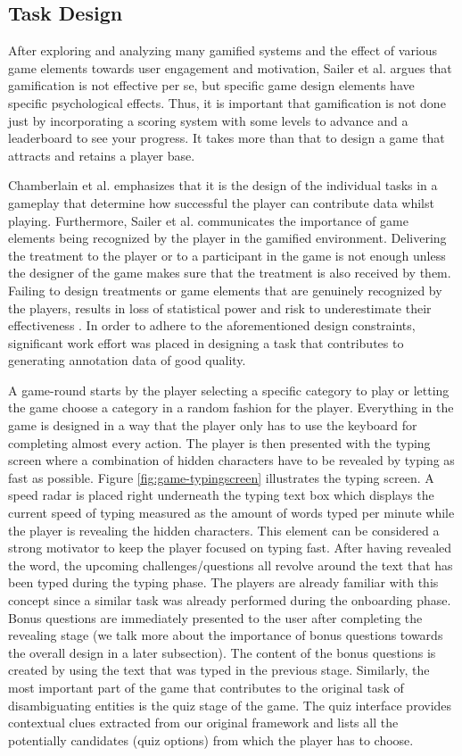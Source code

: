 \subsection{Task Design}
After exploring and analyzing many gamified systems and the effect of various game elements towards user engagement and motivation, Sailer et al. \cite{45} argues that gamification is not effective per se, but specific game design elements have specific psychological effects. Thus, it is important that gamification is not done just by incorporating a scoring system with some levels to advance and a leaderboard to see your progress. It takes more than that to design a game that attracts and retains a player base. 

Chamberlain et al. \cite{43} emphasizes that it is the design of the individual tasks in a gameplay that determine how successful the player can contribute data whilst playing. Furthermore, Sailer et al. \cite{45} communicates the importance of game elements being recognized by the player in the gamified environment. Delivering the treatment to the player or to a participant in the game is not enough unless the designer of the game makes sure that the treatment is also received by them. Failing to design treatments or game elements that are genuinely recognized by the players, results in loss of statistical power and risk to underestimate their effectiveness \cite{45}. In order to adhere to the aforementioned design constraints, significant work effort was placed in designing a task that contributes to generating annotation data of good quality. 


A game-round starts by the player selecting a specific category to play or letting the game choose a category in a random fashion for the player. Everything in the game is designed in a way that the player only has to use the keyboard for completing almost every action. The player is then presented with the typing screen where a combination of hidden characters have to be revealed by typing as fast as possible. Figure \ref{fig:game-typingscreen} illustrates the typing screen. A speed radar is placed right underneath the typing text box which displays the current speed of typing measured as the amount of words typed per minute while the player is revealing the hidden characters. This element can be considered a strong motivator to keep the player focused on typing fast. After having revealed the word, the upcoming challenges/questions all revolve around the text that has been typed during the typing phase. The players are already familiar with this concept since a similar task was already performed during the onboarding phase. Bonus questions are immediately presented to the user after completing the revealing stage (we talk more about the importance of bonus questions towards the overall design in a later subsection). The content of the bonus questions is created by using the text that was typed in the previous stage. Similarly, the most important part of the game that contributes to the original task of disambiguating entities is the quiz stage of the game. The quiz interface provides contextual clues extracted from our original framework and lists all the potentially candidates (quiz options) from which the player has to choose. 

